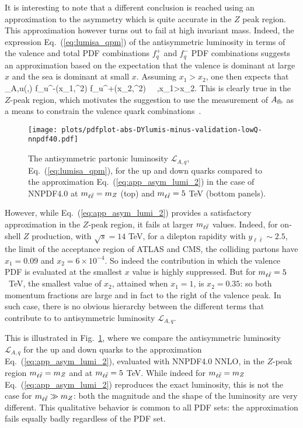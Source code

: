 It is interesting to note that a different conclusion is reached using
an approximation to the asymmetry which is quite accurate  in the $Z$
peak region.
%
This approximation however turns out to fail at high
invariant mass.
%
Indeed, the expression Eq.~(\ref{eq:lumisa_qpm}) of the antisymmetric
luminosity in terms of the valence 
and total PDF combinations $f_q^+$ and $f_q^-$ PDF combinations
suggests an approximation based on the expectation
that the valence is dominant at large $x$ and the sea is dominant at
small $x$. Assuming $x_1> x_2$, one then expects that
\be
{}_{A,u}(\yll,\mll) \approx{} f_u^-(x_1,\mll^2)
f_{u}^+(x_2,\mll^2)   \,  \, ,\quad x_1>x_2.
\label{eq:app_asym_lumi_2}
\ee
This is clearly true  in the $Z$-peak region, which  motivates the
suggestion to use the measurement of $A_{\rm fb}$ as a means to
 constrain the valence quark combinations~\cite{Accomando:2019vqt}.

\begin{figure}[!t]
 \centering
 \texttt{[image: plots/pdfplot-abs-DYlumis-minus-validation-lowQ-nnpdf40.pdf]}
 \caption{The  antisymmetric partonic luminosity $\mathcal{L}_{A,q}$, Eq.~(\ref{eq:lumisa_qpm}),
for the up and down quarks 
compared to the approximation 
Eq.~(\ref{eq:app_asym_lumi_2}) in the case of NNPDF4.0
at $m_{\ell\bar{\ell}}=m_Z$ (top)
and $m_{\ell\bar{\ell}}=5$ TeV (bottom panels).
 }    
 \label{fig:pdfplot-abs-DYlumis-minus-validation-lowQ-nnpdf40}
\end{figure}

However, while Eq.~(\ref{eq:app_asym_lumi_2}) provides
a satisfactory approximation in the  $Z$-peak region,
it fails  at larger $m_{\ell\bar{\ell}}$ values. Indeed, for on-shell $Z$
production, with $\sqrt{s}=14$ TeV,
for a dilepton rapidity with $y_{\ell\bar{\ell}}\sim 2.5$, the limit of the
acceptance region
of ATLAS and CMS, the colliding partons have
$x_1=0.09$ and $x_2=6\times 10^{-4}$. So indeed the contribution in
which the valence PDF is evaluated at the smallest $x$ value is highly suppressed.
%
But for $m_{\ell\bar{\ell}}=5$~TeV, the smallest value of $x_2$, attained when
$x_1=1$, is $x_2=0.35$: so both momentum fractions are large and in fact
to the right of the valence peak.
%
In such case, there 
is no obvious hierarchy between
the different terms that contribute to to antisymmetric
luminosity $\mathcal{L}_{A,q}$.

This is illustrated in
Fig.~\ref{fig:pdfplot-abs-DYlumis-minus-validation-lowQ-nnpdf40},
where we compare the antisymmetric luminosity $\mathcal{L}_{A,q}$
for the up and down quarks 
to the approximation
Eq.~(\ref{eq:app_asym_lumi_2}), evaluated with NNPDF4.0 NNLO,
in the $Z$-peak region $m_{\ell\bar{\ell}}=m_Z$ 
and at $m_{\ell\bar{\ell}}=5$ TeV.
%
While indeed for $m_{\ell\bar{\ell}}=m_Z$ Eq.~(\ref{eq:app_asym_lumi_2}) reproduces
the exact luminosity, this is not the case for $m_{\ell\bar{\ell}}\gg m_Z$: both
the magnitude and the shape of the luminosity are  very different.
%
This qualitative behavior is common to all PDF sets: the approximation
fails equally badly regardless of the PDF set.

